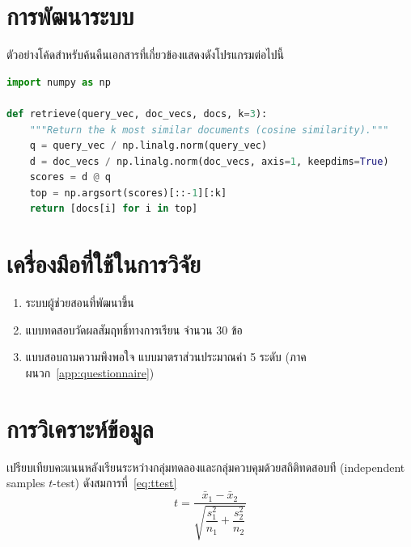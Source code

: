 \section{การพัฒนาระบบ}

ตัวอย่างโค้ดสำหรับค้นคืนเอกสารที่เกี่ยวข้องแสดงดังโปรแกรมต่อไปนี้

\begin{lstlisting}[language=Python]
import numpy as np

def retrieve(query_vec, doc_vecs, docs, k=3):
    """Return the k most similar documents (cosine similarity)."""
    q = query_vec / np.linalg.norm(query_vec)
    d = doc_vecs / np.linalg.norm(doc_vecs, axis=1, keepdims=True)
    scores = d @ q
    top = np.argsort(scores)[::-1][:k]
    return [docs[i] for i in top]
\end{lstlisting}

\section{เครื่องมือที่ใช้ในการวิจัย}

\begin{enumerate}
  \item ระบบผู้ช่วยสอนที่พัฒนาขึ้น
  \item แบบทดสอบวัดผลสัมฤทธิ์ทางการเรียน จำนวน 30 ข้อ
  \item แบบสอบถามความพึงพอใจ แบบมาตราส่วนประมาณค่า 5 ระดับ (ภาคผนวก~\ref{app:questionnaire})
\end{enumerate}

\section{การวิเคราะห์ข้อมูล}

เปรียบเทียบคะแนนหลังเรียนระหว่างกลุ่มทดลองและกลุ่มควบคุมด้วยสถิติทดสอบที (independent samples $t$-test) ดังสมการที่~\eqref{eq:ttest}
\begin{equation}
  t = \frac{\bar{x}_1 - \bar{x}_2}{\sqrt{\dfrac{s_1^2}{n_1} + \dfrac{s_2^2}{n_2}}}
  \label{eq:ttest}
\end{equation}
